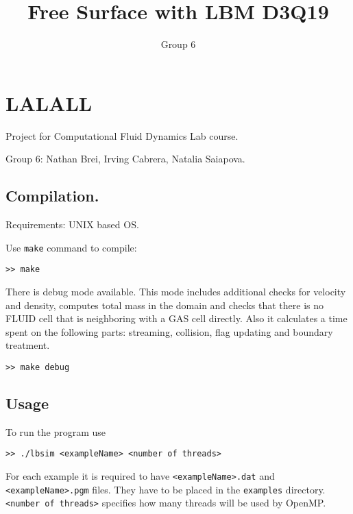 \documentclass{article}
\begin{document}
\title{Free Surface with LBM D3Q19}
\author{Group 6}

\maketitle

\section{LALALL}\label{free-surfaces-with-lbm-d3q19}

Project for Computational Fluid Dynamics Lab course.

Group 6: Nathan Brei, Irving Cabrera, Natalia Saiapova.

\subsection{Compilation.}\label{compilation.}

Requirements: UNIX based OS.

Use \texttt{make} command to compile:

\begin{verbatim}
>> make
\end{verbatim}

There is debug mode available. This mode includes additional checks for
velocity and density, computes total mass in the domain and checks that
there is no FLUID cell that is neighboring with a GAS cell directly.
Also it calculates a time spent on the following parts: streaming,
collision, flag updating and boundary treatment.

\begin{verbatim}
>> make debug
\end{verbatim}

\subsection{Usage}\label{usage}

To run the program use

\begin{verbatim}
>> ./lbsim <exampleName> <number of threads>
\end{verbatim}

For each example it is required to have
\texttt{\textless{}exampleName\textgreater{}.dat} and
\texttt{\textless{}exampleName\textgreater{}.pgm} files. They have to be
placed in the \texttt{examples} directory.\\
\texttt{\textless{}number\ of\ threads\textgreater{}} specifies how many
threads will be used by OpenMP.
\end{document}
